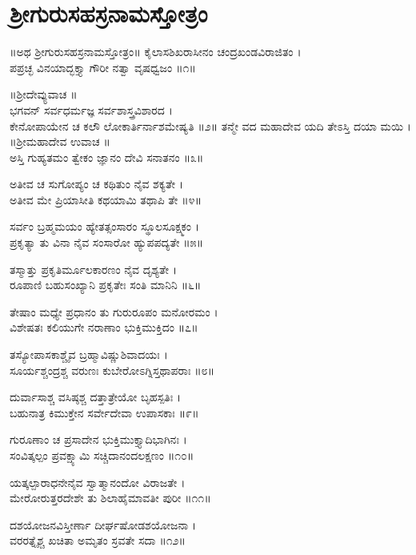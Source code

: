 
\section{ಶ್ರೀಗುರುಸಹಸ್ರನಾಮಸ್ತೋತ್ರಂ}

॥ಅಥ ಶ್ರೀಗುರುಸಹಸ್ರನಾಮಸ್ತೋತ್ರಂ॥
ಕೈಲಾಸಶಿಖರಾಸೀನಂ ಚಂದ್ರಖಂಡವಿರಾಜಿತಂ ।\\
ಪಪ್ರಚ್ಛ ವಿನಯಾದ್ಭಕ್ತ್ಯಾ ಗೌರೀ ನತ್ವಾ ವೃಷಧ್ವಜಂ ॥೧॥

॥ಶ್ರೀದೇವ್ಯುವಾಚ ॥\\
ಭಗವನ್ ಸರ್ವಧರ್ಮಜ್ಞ ಸರ್ವಶಾಸ್ತ್ರವಿಶಾರದ ।\\
ಕೇನೋಪಾಯೇನ ಚ ಕಲೌ ಲೋಕಾರ್ತಿರ್ನಾಶಮೇಷ್ಯತಿ ॥೨॥
ತನ್ಮೇ ವದ ಮಹಾದೇವ ಯದಿ ತೇಽಸ್ತಿ ದಯಾ ಮಯಿ ।\\

॥ಶ್ರೀಮಹಾದೇವ ಉವಾಚ ॥\\
ಅಸ್ತಿ ಗುಹ್ಯತಮಂ ತ್ವೇಕಂ ಜ್ಞಾನಂ ದೇವಿ ಸನಾತನಂ ॥೩॥

ಅತೀವ ಚ ಸುಗೋಪ್ಯಂ ಚ ಕಥಿತುಂ ನೈವ ಶಕ್ಯತೇ ।\\
ಅತೀವ ಮೇ ಪ್ರಿಯಾಸೀತಿ ಕಥಯಾಮಿ ತಥಾಪಿ ತೇ ॥೪॥

ಸರ್ವಂ ಬ್ರಹ್ಮಮಯಂ ಹ್ಯೇತತ್ಸಂಸಾರಂ ಸ್ಥೂಲಸೂಕ್ಷ್ಮಕಂ ।\\
ಪ್ರಕೃತ್ಯಾ ತು ವಿನಾ ನೈವ ಸಂಸಾರೋ ಹ್ಯುಪಪದ್ಯತೇ ॥೫॥

ತಸ್ಮಾತ್ತು ಪ್ರಕೃತಿರ್ಮೂಲಕಾರಣಂ ನೈವ ದೃಶ್ಯತೇ ।\\
ರೂಪಾಣಿ ಬಹುಸಂಖ್ಯಾನಿ ಪ್ರಕೃತೇಃ ಸಂತಿ ಮಾನಿನಿ ॥೬॥

ತೇಷಾಂ ಮಧ್ಯೇ ಪ್ರಧಾನಂ ತು ಗುರುರೂಪಂ ಮನೋರಮಂ ।\\
ವಿಶೇಷತಃ ಕಲಿಯುಗೇ ನರಾಣಾಂ ಭುಕ್ತಿಮುಕ್ತಿದಂ ॥೭॥

ತಸ್ಯೋಪಾಸಕಾಶ್ಚೈವ ಬ್ರಹ್ಮಾವಿಷ್ಣುಶಿವಾದಯಃ ।\\
ಸೂರ್ಯಶ್ಚಂದ್ರಶ್ಚ ವರುಣಃ ಕುಬೇರೋಽಗ್ನಿಸ್ತಥಾಪರಾಃ ॥೮॥

ದುರ್ವಾಸಾಶ್ಚ ವಸಿಷ್ಠಶ್ಚ ದತ್ತಾತ್ರೇಯೋ ಬೃಹಸ್ಪತಿಃ ।\\
ಬಹುನಾತ್ರ ಕಿಮುಕ್ತೇನ ಸರ್ವೇದೇವಾ ಉಪಾಸಕಾಃ ॥೯॥

ಗುರೂಣಾಂ ಚ ಪ್ರಸಾದೇನ ಭುಕ್ತಿಮುಕ್ತ್ಯಾದಿಭಾಗಿನಃ ।\\
ಸಂವಿತ್ಕಲ್ಪಂ ಪ್ರವಕ್ಷ್ಯಾಮಿ ಸಚ್ಚಿದಾನಂದಲಕ್ಷಣಂ ॥೧೦॥

ಯತ್ಕಲ್ಪಾರಾಧನೇನೈವ ಸ್ವಾತ್ಮಾನಂದೋ ವಿರಾಜತೇ ।\\
ಮೇರೋರುತ್ತರದೇಶೇ ತು ಶಿಲಾಹೈಮಾವತೀ ಪುರೀ ॥೧೧॥

ದಶಯೋಜನವಿಸ್ತೀರ್ಣಾ ದೀರ್ಘಷೋಡಶಯೋಜನಾ ।\\
ವರರತ್ನೈಶ್ಚ ಖಚಿತಾ ಅಮೃತಂ ಸ್ರವತೇ ಸದಾ ॥೧೨॥

